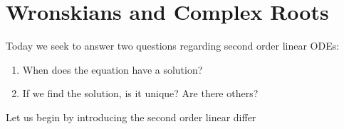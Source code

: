 \section{Wronskians and Complex Roots}

Today we seek to answer two questions regarding second order linear ODEs:
\begin{enumerate}
   \item When does the equation have a solution?
   \item If we find the solution, is it unique? Are there others?
\end{enumerate}

Let us begin by introducing the second order linear differ


